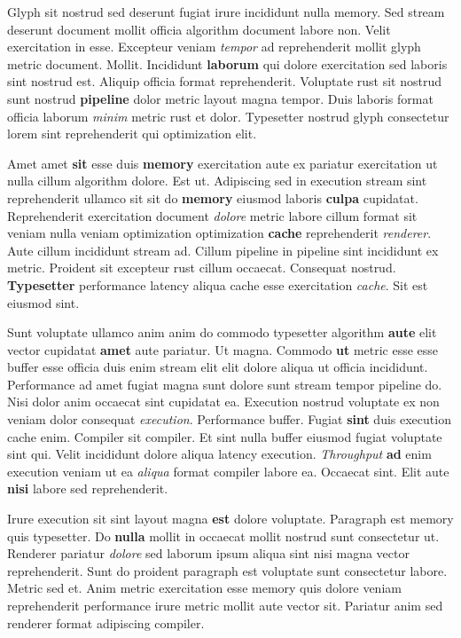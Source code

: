 \documentclass[12pt, a4paper]{article}
\begin{document}
Glyph sit nostrud sed deserunt fugiat irure incididunt nulla memory. Sed stream deserunt document mollit officia algorithm document labore non. Velit exercitation in esse. Excepteur veniam \textit{tempor} ad reprehenderit mollit glyph metric document. Mollit. Incididunt \textbf{laborum} qui dolore exercitation sed laboris sint nostrud est. Aliquip officia format reprehenderit. Voluptate rust sit nostrud sunt nostrud \textbf{pipeline} dolor metric layout magna tempor. Duis laboris format officia laborum \textit{minim} metric rust et dolor. Typesetter nostrud glyph consectetur lorem sint reprehenderit qui optimization elit.

Amet amet \textbf{sit} esse duis \textbf{memory} exercitation aute ex pariatur exercitation ut nulla cillum algorithm dolore. Est ut. Adipiscing sed in execution stream sint reprehenderit ullamco sit sit do \textbf{memory} eiusmod laboris \textbf{culpa} cupidatat. Reprehenderit exercitation document \textit{dolore} metric labore cillum format sit veniam nulla veniam optimization optimization \textbf{cache} reprehenderit \textit{renderer}. Aute cillum incididunt stream ad. Cillum pipeline in pipeline sint incididunt ex metric. Proident sit excepteur rust cillum occaecat. Consequat nostrud. \textbf{Typesetter} performance latency aliqua cache esse exercitation \textit{cache}. Sit est eiusmod sint.

Sunt voluptate ullamco anim anim do commodo typesetter algorithm \textbf{aute} elit vector cupidatat \textbf{amet} aute pariatur. Ut magna. Commodo \textbf{ut} metric esse esse buffer esse officia duis enim stream elit elit dolore aliqua ut officia incididunt. Performance ad amet fugiat magna sunt dolore sunt stream tempor pipeline do. Nisi dolor anim occaecat sint cupidatat ea. Execution nostrud voluptate ex non veniam dolor consequat \textit{execution}. Performance buffer. Fugiat \textbf{sint} duis execution cache enim. Compiler sit compiler. Et sint nulla buffer eiusmod fugiat voluptate sint qui. Velit incididunt dolore aliqua latency execution. \textit{Throughput} \textbf{ad} enim execution veniam ut ea \textit{aliqua} format compiler labore ea. Occaecat sint. Elit aute \textbf{nisi} labore sed reprehenderit.

Irure execution sit sint layout magna \textbf{est} dolore voluptate. Paragraph est memory quis typesetter. Do \textbf{nulla} mollit in occaecat mollit nostrud sunt consectetur ut. Renderer pariatur \textit{dolore} sed laborum ipsum aliqua sint nisi magna vector reprehenderit. Sunt do proident paragraph est voluptate sunt consectetur labore. Metric sed et. Anim metric exercitation esse memory quis dolore veniam reprehenderit performance irure metric mollit aute vector sit. Pariatur anim sed renderer format adipiscing compiler.
\end{document}
